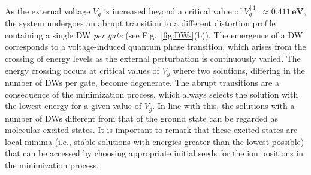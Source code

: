 \documentclass[10pt,a4paper]{article}
\begin{document}
As the external voltage $V_{g}$ is increased beyond a critical value of ${V_{g}^{[1]} \approx 0.411 \, \textbf{eV}}$, the system undergoes an abrupt transition to a different distortion profile containing a single DW \textit{per gate} (see Fig.~\ref{fig:DWs}(b)). The emergence of a DW corresponds to a voltage-induced quantum phase transition\cite{sachdev1999quantum}, which arises from the crossing of energy levels as the external perturbation is continuously varied. The energy crossing occurs at critical values of $V_{g}$ where two solutions, differing in the number of DWs per gate, become  degenerate. The abrupt transitions are a consequence of the minimization process, which always selects the solution with the lowest energy for a given value of $V_{g}$. In line with this, the solutions with a number of DWs different from that of the ground state can be regarded as molecular excited states. It is important to remark that these  excited states are local minima (i.e., stable solutions with energies greater than the lowest possible) that can be accessed by choosing appropriate initial seeds for the ion positions in the minimization process.
\end{document}
